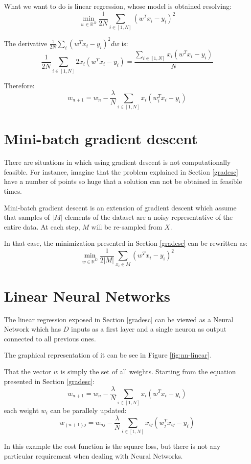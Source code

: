What we want to do is linear regression, whose model is obtained resolving:
$$\displaystyle \min_{w \in \mathbb{R}^D} \frac{1}{2N} \sum_{i \in [1, N]} (w^T x_i - y_i)^2$$

The derivative  $\frac{1}{2N} \sum_i (w^T x_i - y_i)^2 dw$ is:
$$\frac{1}{2N} \sum_{i \in [1, N]} 2 x_i(w^T x_i - y_i) = \frac{\sum_{i \in [1, N]} x_i(w^T x_i - y_i)}{N}$$

Therefore:
$$ w_{n+1} = w_n - \frac{\lambda}{N} \sum_{i \in [1, N]} x_i(w_i^T x_i - y_i) $$


\section{Mini-batch gradient descent}
There are situations in which using gradient descent is not computationally feasible.
For instance, imagine that the problem explained in Section \ref{gradesc} have
a number of points so huge that a solution can not be obtained in feasible times.

Mini-batch gradient descent is an extension of gradient descent which assume that
samples of $|M|$ elements of the dataset are a noisy representative of the entire data.
At each step, $M$ will be re-sampled from $X$.

In that case, the minimization presented in Section \ref{gradesc} can be rewritten as:
$$\displaystyle \min_{w \in \mathbb{R}^D} \frac{1}{2|M|} \sum_{x_i \in M} (w^T x_i - y_i)^2 $$

\section{Linear Neural Networks}
The linear regression exposed in Section \ref{gradesc} can be viewed as a Neural Network
which has $D$ inputs as a first layer and a single neuron as output connected to all previous ones.

The graphical representation of it can be see in Figure \ref{fig:nn-linear}.

That the vector $w$ is simply the set of all weights.
Starting from the equation presented in Section \ref{gradesc}:
$$ w_{n+1} = w_n - \frac{\lambda}{N} \sum_{i \in [1, N]} x_i(w^T x_i - y_i) $$
each weight $w_i$ can be parallely updated:
$$ w_{(n+1)j} = w_{nj} -  \frac{\lambda}{N} \sum_{i \in [1, N]} x_{ij}(w^T_j x_{ij} - y_i) $$

In this example the cost function is the square loss, but there is not any particular requirement when
dealing with Neural Networks.

